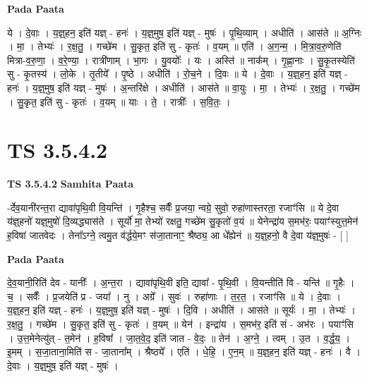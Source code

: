 \documentclass[17pt]{extarticle}
\begin{document}
\textbf{Pada Paata} \newline

ये । दे॒वाः । य॒ज्ञ्॒हन॒ इति॑ यज्ञ् - हनः॑ । य॒ज्ञ्॒मुष॒ इति॑ यज्ञ् - मुषः॑ । पृ॒थि॒व्याम् । अधीति॑ । आस॑ते ॥ अ॒ग्निः । मा॒ । तेभ्यः॑ । र॒क्ष॒तु॒ । गच्छे॑म । सु॒कृत॒ इति॑ सु - कृतः॑ । व॒यम् ॥ एति॑ । अ॒ग॒न्म॒ । मि॒त्रा॒व॒रु॒णेति॑ मित्रा-व॒रु॒णा॒ । व॒रे॒ण्या॒ । रात्री॑णाम् । भा॒गः । यु॒वयोः᳚ । यः । अस्ति॑ ॥ नाक᳚म् । गृ॒ह्णा॒नाः । सु॒कृ॒तस्येति॑ सु - कृ॒तस्य॑ । लो॒के । तृ॒तीये᳚ । पृ॒ष्ठे । अधीति॑ । रो॒च॒ने । दि॒वः ॥ ये । दे॒वाः । य॒ज्ञ्॒हन॒ इति॑ यज्ञ् - हनः॑ । य॒ज्ञ्॒मुष॒ इति॑ यज्ञ् - मुषः॑ । अ॒न्तरि॑क्षे । अधीति॑ । आस॑ते ॥ वा॒युः । मा॒ । तेभ्यः॑ । र॒क्ष॒तु॒ । गच्छे॑म । सु॒कृत॒ इति॑ सु - कृतः॑ । व॒यम् ॥ याः । ते॒ । रात्रीः᳚ । स॒वि॒तः॒ ।  \newline





\section{ TS 3.5.4.2 }

\textbf{TS 3.5.4.2 } \newline
\textbf{Samhita Paata} \newline

-र्देव॒यानी॑रन्त॒रा द्यावा॑पृथि॒वी वि॒यन्ति॑ । गृ॒हैश्च॒ सर्वैः᳚ प्र॒जया॒ न्वग्रे॒ सुवो॒ रुहा॑णास्तरता॒ रजाꣳ॑सि ॥ ये दे॒वा य॑ज्ञ्॒हनो॑ यज्ञ्॒मुषो॑ दि॒व्यद्ध्यास॑ते । सूर्यो॑ मा॒ तेभ्यो॑ रक्षतु॒ गच्छे॑म सु॒कृतो॑ व॒यं ॥ येनेन्द्रा॑य स॒मभ॑रः॒ पयाꣳ॑स्युत्त॒मेन॑ ह॒विषा॑ जातवेदः । तेना᳚ऽग्ने॒ त्वमु॒त व॑र्द्धये॒मꣳ स॑जा॒तानाꣳ॒॒ श्रैष्ठ्य॒ आ धे᳚ह्येनं ॥ य॒ज्ञ्॒हनो॒ वै दे॒वा य॑ज्ञ्॒मुषः॑ - [  ] \newline

\textbf{Pada Paata} \newline

दे॒व॒यानी॒रिति॑ देव - यानीः᳚ । अ॒न्त॒रा । द्यावा॑पृथि॒वी इति॒ द्यावा᳚ - पृ॒थि॒वी । वि॒यन्तीति॑ वि - यन्ति॑ ॥ गृ॒हैः । च॒ । सर्वैः᳚ । प्र॒जयेति॑ प्र - जया᳚ । नु । अग्रे᳚ । सुवः॑ । रुहा॑णाः । त॒र॒त॒ । रजाꣳ॑सि ॥ ये । दे॒वाः । य॒ज्ञ्॒हन॒ इति॑ यज्ञ् - हनः॑ । य॒ज्ञ्॒मुष॒ इति॑ यज्ञ् - मुषः॑ । दि॒वि । अधीति॑ । आस॑ते ॥ सूर्यः॑ । मा॒ । तेभ्यः॑ । र॒क्ष॒तु॒ । गच्छे॑म । सु॒कृत॒ इति॑ सु - कृतः॑ । व॒यम् ॥ येन॑ । इन्द्रा॑य । स॒मभ॑र॒ इति॑ सं - अभ॑रः । पयाꣳ॑सि । उ॒त्त॒मेनेत्यु॑त् - त॒मेन॑ । ह॒विषा᳚ । जा॒त॒वे॒द॒ इति॑ जात - वे॒दः॒ ॥ तेन॑ । अ॒ग्ने॒ । त्वम् । उ॒त । व॒र्द्ध॒य॒ । इ॒मम् । स॒जा॒ताना॒मिति॑ स - जा॒ताना᳚म् । श्रैष्ठ्ये᳚ । एति॑ । धे॒हि॒ । ए॒न॒म् ॥ य॒ज्ञ्॒हन॒ इति॑ यज्ञ् - हनः॑ । वै । दे॒वाः । य॒ज्ञ्॒मुष॒ इति॑ यज्ञ् - मुषः॑ ।  \newline
\end{document}
